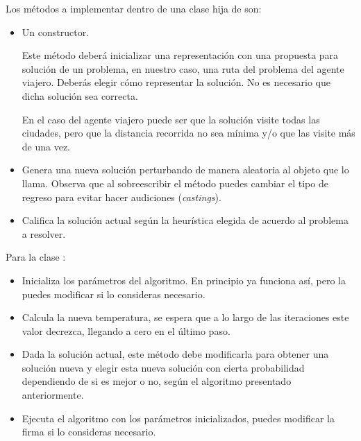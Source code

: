 Los métodos a implementar dentro de una clase hija de  son:
\begin{itemize}
 \item Un constructor.
 
 Este método deberá inicializar una representación con una propuesta para solución de un problema, en nuestro caso, una ruta del problema del agente viajero.  Deberás elegir cómo representar la solución.  No es necesario que dicha solución sea correcta.
 
 En el caso del agente viajero puede ser que la solución visite todas las ciudades, pero que la distancia recorrida no sea mínima y/o que las visite más de una vez.
 
 \item {}
 
 Genera una nueva solución perturbando de manera aleatoria al objeto que lo llama.  Observa que al sobreescribir el método puedes cambiar el tipo de regreso para evitar hacer audiciones (\textit{castings}).
 
 \item {}
 
 Califica la solución actual según la heurística elegida de acuerdo al problema a resolver.
\end{itemize}


Para la clase :
\begin{itemize}
 \item {}
 
 Inicializa los parámetros del algoritmo. En principio ya funciona así, pero la puedes modificar si lo consideras necesario.
 
 \item {}
 
 Calcula la nueva temperatura, se espera que a lo largo de las iteraciones este valor decrezca, llegando a cero en el último paso.
 
 \item {}
 
 Dada la solución actual, este método debe modificarla para obtener una solución nueva y elegir esta nueva solución con cierta probabilidad dependiendo de si es mejor o no, según el algoritmo presentado anteriormente.
 
 \item {}
 
 Ejecuta el algoritmo con los parámetros inicializados, puedes modificar la firma si lo consideras necesario.
\end{itemize}

